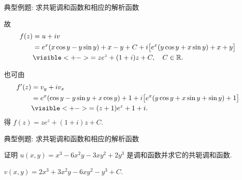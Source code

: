 \begin{frame}{典型例题: 求共轭调和函数和相应的解析函数}
	\onslide<+->
	\begin{solutionc}
		故
		\vspace{-.5\baselineskip}
		\begin{align*}
			f(z)&=u+iv\\
			&=e^x(x\cos y-y\sin y)+x-y+C
			+i\bigl[e^x(y\cos y+x\sin y)+x+y\bigr]\\
			&\visible<+->{=ze^z+(1+i)z+C,\quad C\in\BR.}
		\end{align*}
	\end{solutionc}
	\onslide<+->
	也可由
	\vspace{-.5\baselineskip}
	\begin{align*}
		f'(z)&=v_y+iv_x\\
		&=e^x(\cos y-y\sin y+x\cos y)+1
		+i\bigl[e^x(y\cos y+x\sin y+\sin y)+1\bigr]\\
		&\visible<+->{=(z+1)e^z+1+i.}
	\end{align*}
	\vspace{-.5\baselineskip}
	\onslide<+->
	得 $f(z)=ze^z+(1+i)z+C$.
\end{frame}


\begin{frame}{典型例题: 求共轭调和函数和相应的解析函数}
	\onslide<+->
	\begin{exercise}
		证明 $u(x,y)=x^3-6x^2y-3xy^2+2y^3$ 是调和函数并求它的共轭调和函数.
	\end{exercise}

	\onslide<+->
	\begin{answer}
		$v(x,y)=2x^3+3x^2y-6xy^2-y^3+C$.
	\end{answer}
\end{frame}

